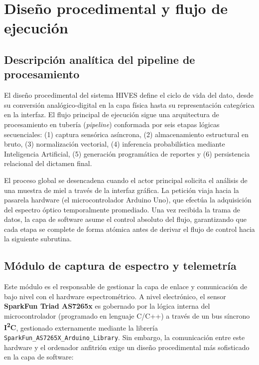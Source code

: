 
\section{Diseño procedimental y flujo de ejecución}

\subsection*{Descripción analítica del pipeline de procesamiento}

El diseño procedimental del sistema HIVES define el ciclo de vida del dato, desde su conversión analógico-digital en la capa física hasta su representación categórica en la interfaz. El flujo principal de ejecución sigue una arquitectura de procesamiento en tubería (\textit{pipeline}) conformada por seis etapas lógicas secuenciales: (1) captura sensórica asíncrona, (2) almacenamiento estructural en bruto, (3) normalización vectorial, (4) inferencia probabilística mediante Inteligencia Artificial, (5) generación programática de reportes y (6) persistencia relacional del dictamen final.

El proceso global se desencadena cuando el actor principal solicita el análisis de una muestra de miel a través de la interfaz gráfica. La petición viaja hacia la pasarela hardware (el microcontrolador Arduino Uno), que efectúa la adquisición del espectro óptico temporalmente promediado. Una vez recibida la trama de datos, la capa de software asume el control absoluto del flujo, garantizando que cada etapa se complete de forma atómica antes de derivar el flujo de control hacia la siguiente subrutina.

\subsection*{Módulo de captura de espectro y telemetría}

Este módulo es el responsable de gestionar la capa de enlace y comunicación de bajo nivel con el hardware espectrométrico. A nivel electrónico, el sensor \textbf{SparkFun Triad AS7265x} es gobernado por la lógica interna del microcontrolador (programado en lenguaje C/C++) a través de un bus síncrono \textbf{I\textsuperscript{2}C}, gestionado externamente mediante la librería \texttt{SparkFun\_AS7265X\_Arduino\_Library}. Sin embargo, la comunicación entre este hardware y el ordenador anfitrión exige un diseño procedimental más sofisticado en la capa de software:


